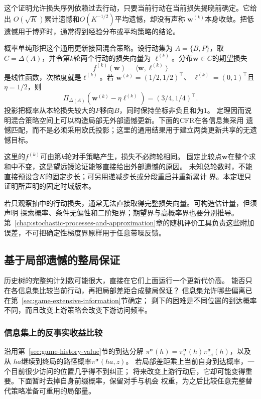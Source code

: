 这个证明允许损失序列依赖过去行动，只要当前行动在当前损失揭晓前确定。它给出
\(O(\sqrt{K})\)累计遗憾和\(O(K^{-1/2})\)平均遗憾，却没有声称
\(\bm{w}^{(k)}\)本身收敛。把低遗憾用于博弈时，通常得到经验分布或平均策略的结论。

概率单纯形把这个通用更新接回混合策略。设行动集为
\(A=\{B,P\}\)，取\(C=\Delta(A)\)，并令第\(k\)轮两个行动的损失向量为
\(\bm{\ell}^{(k)}\)。分布\(\bm{w}\in C\)的期望损失
\[
  f^{(k)}(\bm{w})
  =
  \langle\bm{w},\bm{\ell}^{(k)}\rangle
\]
是线性函数，次梯度就是\(\bm{\ell}^{(k)}\)。若
\(\bm{w}^{(k)}=(1/2,1/2)^{\top}\)、
\(\bm{\ell}^{(k)}=(0,1)^{\top}\)且\(\eta=1/2\)，则
\[
  \Pi_{\Delta(A)}
  \left(
    \bm{w}^{(k)}-\eta\bm{\ell}^{(k)}
  \right)
  =
  (3/4,1/4)^{\top}.
\]
投影把概率从本轮损失较大的\(P\)移向\(B\)，同时保持坐标非负且和为\(1\)。
定理因而说明混合策略空间上可以构造局部无外部遗憾更新。下面的CFR在各信息集采用
遗憾匹配，而不是必须采用欧氏投影；这里的通用结果用于建立两类更新共享的无遗憾目标。

这里的\(f^{(k)}\)可由第\(k\)轮对手策略产生，损失不必跨轮相同。
固定比较点\(\bm w\)在整个求和中不变，这是望远镜论证能够直接给出外部遗憾的原因。
未知总轮数时，不能直接预设含\(K\)的固定步长；可另用递减步长或分段重启并重新累计
界。本定理只证明所声明的固定时域版本。

若只观察抽中的行动损失，通常无法直接取得完整损失向量。可构造估计量，但须声明
探索概率、条件无偏性和二阶矩界；期望界与高概率界也要分别推导。
第~\ref{chap:stochastic-processes-and-approximation}章的随机评价工具负责这些附加
误差，不可把确定性梯度界原样用于任意带噪反馈。

\subsection{基于局部遗憾的整局保证}
\label{sec:game-local-to-global-regret}

历史树的完整纯计划数可能很大，直接在它们上面运行一个更新代价高。
能否只在各信息集比较当前行动，再把局部差距合成整局保证？
信息集允许哪些偏离已在第~\ref{sec:game-extensive-information}节确定；
剩下的困难是不同位置的到达概率不同，而且改变上游策略会改变下游访问频率。

\subsubsection{信息集上的反事实收益比较}
\label{sec:game-counterfactual-comparison}

沿用第~\ref{sec:game-history-value}节的到达分解
\(\pi^{\bm\sigma}(h)=\pi_i^{\bm\sigma}(h)\pi_{-i}^{\bm\sigma}(h)\)，以及从
\(ha\)继续到终局的路径概率\(\pi^{\bm\sigma}(ha,z)\)。
若局部差距乘上当前自身到达概率，一个目前很少访问的位置几乎得不到纠正；
将来改变上游行动后，它却可能变得重要。下面暂时去掉自身前缀概率，保留对手与机会
权重，为之后比较任意完整替代策略准备可重用的局部量。


